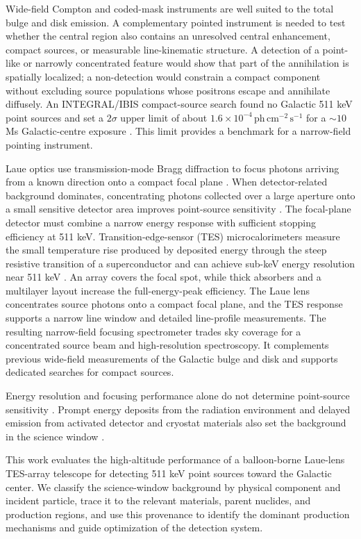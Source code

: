 \documentclass[11pt]{article}
\newcommand{\phcms}{\ensuremath{\,\mathrm{ph\,cm^{-2}\,s^{-1}}}}
\begin{document}
Wide-field Compton and coded-mask instruments are well suited to the total
bulge and disk emission. A complementary pointed instrument is needed to test
whether the central region also contains an unresolved central enhancement,
compact sources, or measurable line-kinematic structure. A detection of a
point-like or narrowly concentrated feature would show that part of the
annihilation is spatially localized; a non-detection would constrain a compact
component without excluding source populations whose positrons escape and
annihilate diffusely. An INTEGRAL/IBIS compact-source search found no Galactic
511 keV point sources and set a $2\sigma$ upper limit of about
$1.6\times10^{-4}\phcms$ for a $\sim10$ Ms Galactic-centre exposure
\cite{DeCesare2011}. This limit provides a benchmark for a narrow-field
pointing instrument.

Laue optics use transmission-mode Bragg diffraction to focus photons arriving
from a known direction onto a compact focal plane
\cite{Barriere2009Laue,Barriere2011LauePrototype}. When detector-related
background dominates, concentrating photons collected over a large aperture
onto a small sensitive detector area improves point-source sensitivity
\cite{Weidenspointner2006MAX}. The focal-plane detector must combine a narrow
energy response with sufficient stopping efficiency at 511 keV.
Transition-edge-sensor (TES) microcalorimeters measure the small temperature
rise produced by deposited energy through the steep resistive transition of a
superconductor and can achieve sub-keV energy resolution near 511 keV
\cite{Shirazi2023,Zhang2022TESGamma}. An array covers the focal spot, while thick
absorbers and a multilayer layout increase the full-energy-peak efficiency. The
Laue lens concentrates source photons onto a compact focal plane, and the TES
response supports a narrow line window and detailed line-profile measurements.
The resulting narrow-field focusing spectrometer trades sky coverage for a
concentrated source beam and high-resolution spectroscopy. It complements
previous wide-field measurements of the Galactic bulge and disk and supports
dedicated searches for compact sources.

Energy resolution and focusing performance alone do not determine point-source
sensitivity \cite{Shirazi2023,Hu2026}. Prompt energy deposits from the radiation
environment and delayed emission from activated detector and cryostat materials
also set the background in the science window
\cite{Gallego2025Balloon,Tian2026DIXE}.

This work evaluates the high-altitude performance of a balloon-borne Laue-lens
TES-array telescope for detecting 511 keV point sources toward the Galactic
center. We classify the science-window background by physical component and
incident particle, trace it to the relevant materials, parent nuclides, and
production regions, and use this provenance to identify the dominant production
mechanisms and guide optimization of the detection system.
\end{document}
